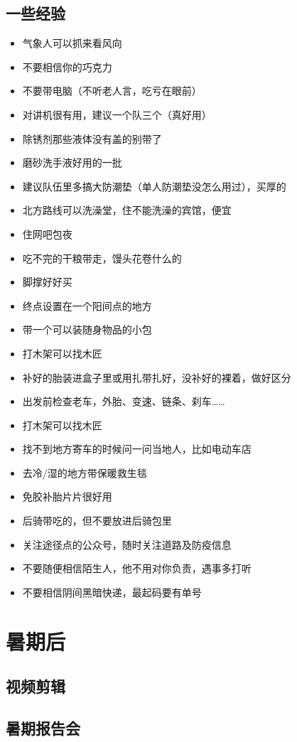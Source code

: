 \documentclass{ctexbook}
\begin{document}
\subsection{一些经验}
\begin{itemize}
\item 气象人可以抓来看风向
\item 不要相信你的巧克力
\item 不要带电脑（不听老人言，吃亏在眼前）
\item 对讲机很有用，建议一个队三个（真好用）
\item 除锈剂那些液体没有盖的别带了
\item 磨砂洗手液好用的一批
\item 建议队伍里多搞大防潮垫（单人防潮垫没怎么用过），买厚的
\item 北方路线可以洗澡堂，住不能洗澡的宾馆，便宜
\item 住网吧包夜
\item 吃不完的干粮带走，馒头花卷什么的
\item 脚撑好好买
\item 终点设置在一个阳间点的地方
\item 带一个可以装随身物品的小包
\item 打木架可以找木匠
\item 补好的胎装进盒子里或用扎带扎好，没补好的裸着，做好区分
\item 出发前检查老车，外胎、变速、链条、刹车……
\item 打木架可以找木匠
\item 找不到地方寄车的时候问一问当地人，比如电动车店
\item 去冷/湿的地方带保暖救生毯
\item 免胶补胎片片很好用
\item 后骑带吃的，但不要放进后骑包里
\item 关注途径点的公众号，随时关注道路及防疫信息
\item 不要随便相信陌生人，他不用对你负责，遇事多打听
\item 不要相信阴间黑暗快递，最起码要有单号
\end{itemize}
\section{暑期后}
\subsection{视频剪辑}
\subsection{暑期报告会}
\end{document}
